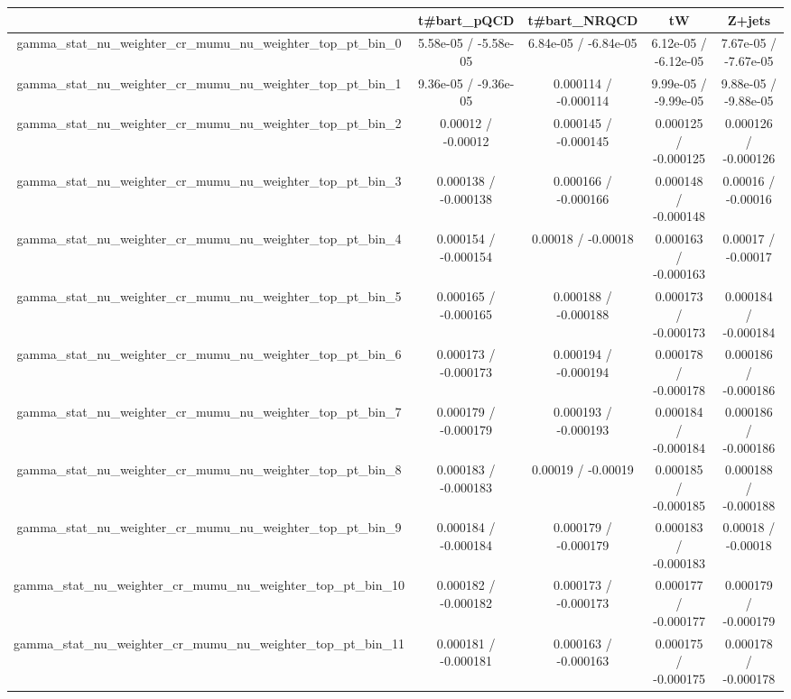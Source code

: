 \documentclass[10pt]{article}
\begin{document}
\begin{table}[htbp]
\begin{center}
\begin{tabular}{|c|c|c|c|c|}
\hline 
      & t#bar{t}_{pQCD}      & t#bar{t}_{NRQCD}      & tW      & Z+jets \\ 
\hline 
  gamma_stat_nu_weighter_cr_mumu_nu_weighter_top_pt_bin_0 & 5.58e-05 / -5.58e-05 & 6.84e-05 / -6.84e-05 & 6.12e-05 / -6.12e-05 & 7.67e-05 / -7.67e-05 \\ 
  gamma_stat_nu_weighter_cr_mumu_nu_weighter_top_pt_bin_1 & 9.36e-05 / -9.36e-05 & 0.000114 / -0.000114 & 9.99e-05 / -9.99e-05 & 9.88e-05 / -9.88e-05 \\ 
  gamma_stat_nu_weighter_cr_mumu_nu_weighter_top_pt_bin_2 & 0.00012 / -0.00012 & 0.000145 / -0.000145 & 0.000125 / -0.000125 & 0.000126 / -0.000126 \\ 
  gamma_stat_nu_weighter_cr_mumu_nu_weighter_top_pt_bin_3 & 0.000138 / -0.000138 & 0.000166 / -0.000166 & 0.000148 / -0.000148 & 0.00016 / -0.00016 \\ 
  gamma_stat_nu_weighter_cr_mumu_nu_weighter_top_pt_bin_4 & 0.000154 / -0.000154 & 0.00018 / -0.00018 & 0.000163 / -0.000163 & 0.00017 / -0.00017 \\ 
  gamma_stat_nu_weighter_cr_mumu_nu_weighter_top_pt_bin_5 & 0.000165 / -0.000165 & 0.000188 / -0.000188 & 0.000173 / -0.000173 & 0.000184 / -0.000184 \\ 
  gamma_stat_nu_weighter_cr_mumu_nu_weighter_top_pt_bin_6 & 0.000173 / -0.000173 & 0.000194 / -0.000194 & 0.000178 / -0.000178 & 0.000186 / -0.000186 \\ 
  gamma_stat_nu_weighter_cr_mumu_nu_weighter_top_pt_bin_7 & 0.000179 / -0.000179 & 0.000193 / -0.000193 & 0.000184 / -0.000184 & 0.000186 / -0.000186 \\ 
  gamma_stat_nu_weighter_cr_mumu_nu_weighter_top_pt_bin_8 & 0.000183 / -0.000183 & 0.00019 / -0.00019 & 0.000185 / -0.000185 & 0.000188 / -0.000188 \\ 
  gamma_stat_nu_weighter_cr_mumu_nu_weighter_top_pt_bin_9 & 0.000184 / -0.000184 & 0.000179 / -0.000179 & 0.000183 / -0.000183 & 0.00018 / -0.00018 \\ 
  gamma_stat_nu_weighter_cr_mumu_nu_weighter_top_pt_bin_10 & 0.000182 / -0.000182 & 0.000173 / -0.000173 & 0.000177 / -0.000177 & 0.000179 / -0.000179 \\ 
  gamma_stat_nu_weighter_cr_mumu_nu_weighter_top_pt_bin_11 & 0.000181 / -0.000181 & 0.000163 / -0.000163 & 0.000175 / -0.000175 & 0.000178 / -0.000178 \\ 

\end{tabular}
\end{center}
\end{table}
\end{document}
